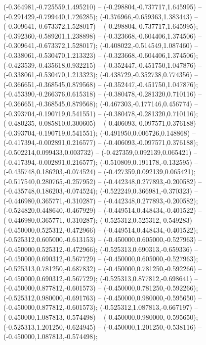  (-0.364981,-0.725559,1.495210) -- (-0.298804,-0.737717,1.645995) -- (-0.291429,-0.799440,1.726285);
 (-0.376966,-0.659363,1.383443) -- (-0.309641,-0.673372,1.528017) -- (-0.298804,-0.737717,1.645995);
 (-0.392360,-0.589201,1.238898) -- (-0.323668,-0.604406,1.374506) -- (-0.309641,-0.673372,1.528017);
 (-0.408022,-0.514549,1.087460) -- (-0.338061,-0.530470,1.213323) -- (-0.323668,-0.604406,1.374506);
 (-0.423539,-0.435618,0.932215) -- (-0.352447,-0.451750,1.047876) -- (-0.338061,-0.530470,1.213323);
 (-0.438729,-0.352738,0.774356) -- (-0.366651,-0.368545,0.879568) -- (-0.352447,-0.451750,1.047876);
 (-0.453390,-0.266376,0.615318) -- (-0.380478,-0.281320,0.710116) -- (-0.366651,-0.368545,0.879568);
 (-0.467303,-0.177146,0.456774) -- (-0.393704,-0.190719,0.541551) -- (-0.380478,-0.281320,0.710116);
 (-0.480235,-0.085810,0.300605) -- (-0.406093,-0.097571,0.376188) -- (-0.393704,-0.190719,0.541551);
 (-0.491950,0.006726,0.148868) -- (-0.417394,-0.002891,0.216577) -- (-0.406093,-0.097571,0.376188);
 (-0.502214,0.099433,0.003732) -- (-0.427359,0.092139,0.065421) -- (-0.417394,-0.002891,0.216577);
 (-0.510809,0.191178,-0.132595) -- (-0.435748,0.186203,-0.074524) -- (-0.427359,0.092139,0.065421);
 (-0.517540,0.280765,-0.257952) -- (-0.442348,0.277893,-0.200582) -- (-0.435748,0.186203,-0.074524);
 (-0.522249,0.366981,-0.370323) -- (-0.446980,0.365771,-0.310287) -- (-0.442348,0.277893,-0.200582);
 (-0.524820,0.448640,-0.467929) -- (-0.449514,0.448434,-0.401522) -- (-0.446980,0.365771,-0.310287);
 (-0.525312,0.525312,-0.549283) -- (-0.450000,0.525312,-0.472966) -- (-0.449514,0.448434,-0.401522);
 (-0.525312,0.605000,-0.613153) -- (-0.450000,0.605000,-0.527963) -- (-0.450000,0.525312,-0.472966);
 (-0.525313,0.690313,-0.659336) -- (-0.450000,0.690312,-0.567729) -- (-0.450000,0.605000,-0.527963);
 (-0.525313,0.781250,-0.687832) -- (-0.450000,0.781250,-0.592266) -- (-0.450000,0.690312,-0.567729);
 (-0.525313,0.877812,-0.698641) -- (-0.450000,0.877812,-0.601573) -- (-0.450000,0.781250,-0.592266);
 (-0.525312,0.980000,-0.691763) -- (-0.450000,0.980000,-0.595650) -- (-0.450000,0.877812,-0.601573);
 (-0.525312,1.087813,-0.667197) -- (-0.450000,1.087813,-0.574498) -- (-0.450000,0.980000,-0.595650);
 (-0.525313,1.201250,-0.624945) -- (-0.450000,1.201250,-0.538116) -- (-0.450000,1.087813,-0.574498);
